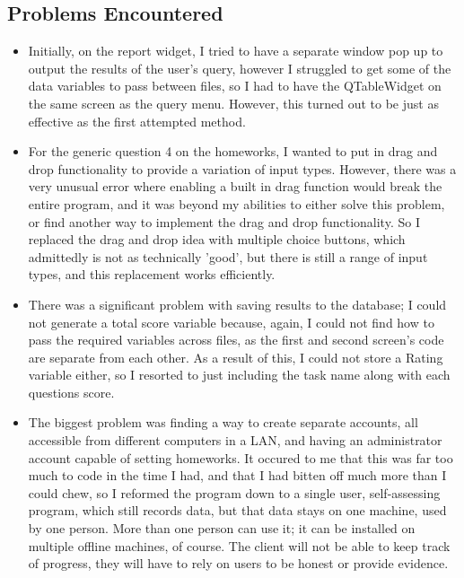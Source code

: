 \subsection{Problems Encountered}

\begin{itemize}
\item Initially, on the report widget, I tried to have a separate window pop up to output the results of the user's query, however I struggled to get some of the data variables to pass between files, so I had to have the QTableWidget on the same screen as the query menu. However, this turned out to be just as effective as the first attempted method.

\item For the generic question 4 on the homeworks, I wanted to put in drag and drop functionality to provide a variation of input types. However, there was a very unusual error where enabling a built in drag function would break the entire program, and it was beyond my abilities to either solve this problem, or find another way to implement the drag and drop functionality. So I replaced the drag and drop idea with multiple choice buttons, which admittedly is not as technically 'good', but there is still a range of input types, and this replacement works efficiently.

\item There was a significant problem with saving results to the database; I could not generate a total score variable because, again, I could not find how to pass the required variables across files, as the first and second screen's code are separate from each other. As a result of this, I could not store a Rating variable either, so I resorted to just including the task name along with each questions score.

\item The biggest problem was finding a way to create separate accounts, all accessible from different computers in a LAN, and having an administrator account capable of setting homeworks. It occured to me that this was far too much to code in the time I had, and that I had bitten off much more than I could chew, so I reformed the program down to a single user, self-assessing program, which still records data, but that data stays on one machine, used by one person. More than one person can use it; it can be installed  on multiple offline machines, of course. The client will not be able to keep track of progress, they will have to rely on users to be honest or provide evidence.


\end{itemize}
